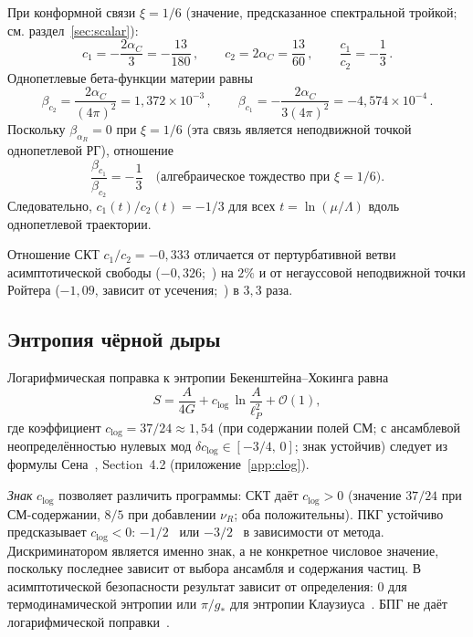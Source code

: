 \documentclass[12pt,a4paper]{article}
\theoremstyle{plain}
\theoremstyle{definition}
\theoremstyle{remark}
\newcommand{\order}{\mathcal{O}}
\begin{document}
При конформной связи $\xi = 1/6$ (значение, предсказанное
спектральной тройкой; см. раздел~\ref{sec:scalar}):
\begin{equation}\label{eq:c1c2}
  c_1 = -\frac{2\alpha_C}{3} = -\frac{13}{180}\,,\qquad
  c_2 = 2\alpha_C = \frac{13}{60}\,,\qquad
  \frac{c_1}{c_2} = -\frac{1}{3}\,.
\end{equation}
Однопетлевые бета-функции материи равны
\begin{equation}\label{eq:betas}
  \beta_{c_2} = \frac{2\alpha_C}{(4\pi)^2}
  = 1{,}372 \times 10^{-3}\,,\qquad
  \beta_{c_1} = -\frac{2\alpha_C}{3(4\pi)^2}
  = -4{,}574 \times 10^{-4}\,.
\end{equation}
Поскольку $\beta_{\alpha_R} = 0$ при $\xi = 1/6$ (эта связь
является неподвижной точкой однопетлевой РГ), отношение
\begin{equation}\label{eq:ratio-frozen}
  \frac{\beta_{c_1}}{\beta_{c_2}} = -\frac{1}{3}
  \quad\text{(алгебраическое тождество при $\xi = 1/6$)}.
\end{equation}
Следовательно, $c_1(t)/c_2(t) = -1/3$ для всех
$t = \ln(\mu/\Lambda)$ вдоль однопетлевой траектории.

Отношение СКТ $c_1/c_2 = -0{,}333$ отличается от пертурбативной
ветви асимптотической свободы ($-0{,}326$;~\cite{Shapiro:2004})
на $2\%$ и от негауссовой неподвижной точки Ройтера
($-1{,}09$, зависит от усечения;~\cite{BMS:2009}) в $3{,}3$ раза.

\subsection{Энтропия чёрной дыры}
\label{sec:clog}

Логарифмическая поправка к энтропии Бекенштейна--Хокинга равна
\begin{equation}\label{eq:clog}
  S = \frac{A}{4G} + c_{\log}\, \ln\frac{A}{\ell_P^2}
  + \order(1),
\end{equation}
где коэффициент $c_{\log} = 37/24 \approx 1{,}54$ (при содержании
полей СМ; с ансамблевой неопределённостью нулевых мод
$\delta c_{\log} \in [-3/4,\, 0]$; знак устойчив) следует из
формулы Сена~\cite{Sen:2012}, Section~4.2
(приложение~\ref{app:clog}).

\emph{Знак} $c_{\log}$ позволяет различить программы: СКТ даёт
$c_{\log} > 0$ (значение $37/24$ при СМ-содержании, $8/5$ при
добавлении $\nu_R$; оба положительны). ПКГ устойчиво предсказывает
$c_{\log} < 0$: $-1/2$~\cite{Meissner:2004} или
$-3/2$~\cite{KaulMajumdar:2000} в зависимости от метода.
Дискриминатором является именно знак, а не конкретное числовое
значение, поскольку последнее зависит от выбора ансамбля и
содержания частиц.
В асимптотической безопасности результат зависит от определения:
$0$ для термодинамической энтропии или $\pi/g_*$ для энтропии
Клаузиуса~\cite{FallsLitim:2012}. БПГ не даёт логарифмической
поправки~\cite{Myung:2017}.
\end{document}
